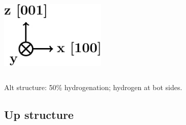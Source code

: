 \documentclass{beamer}
\begin{document}
\begin{frame}
\begin{columns}
\vspace{5mm}

\flushleft
\includegraphics[width=0.9\textwidth]{figs/arrows2.pdf}

\end{columns}

\vspace{-4mm}
\begin{center}
{\Large Alt structure:} 50\% hydrogenation; hydrogen at bot sides.
\end{center}

\end{frame}



\subsection{Up structure}
\end{document}
